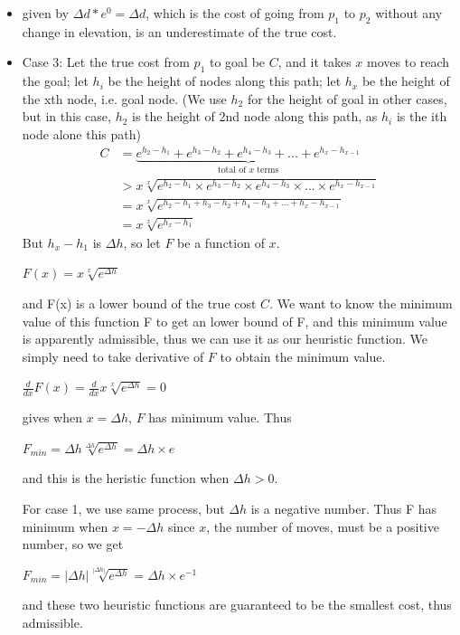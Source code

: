 \documentclass[11pt]{article}  %
\begin{document}
\begin{itemize}
\item  given by $\Delta d * e^{0} = \Delta d$, which is the cost of going from $p_1$ to $p_2$ without any change in elevation, is an underestimate of the true cost. 
\item Case 3: Let the true cost from $p_1$ to goal be $C$, and it takes $x$ moves to reach the goal; let $h_i$ be the height of nodes along this path; let $h_x$ be the height of the xth node, i.e. goal node. (We use $h_2$ for the height of goal in other cases, but in this case, $h_2$ is the height of 2nd node along this path, as $h_i$ is the ith node alone this path)
\begin{align}
C &= \underbrace{e^{h_2-h_1}+e^{h_3-h_2}+e^{h_4-h_3} + ... + e^{h_x-h_{x-1}}}_{\mbox{total of $x$ terms}}\\
&> x \sqrt[x]{e^{h_2-h_1} \times e^{h_3-h_2} \times e^{h_4-h_3} \times ... \times e^{h_x-h_{x-1}}}\\
&= x \sqrt[x]{e^{h_2-h_1+h_3-h_2+h_4-h_3 +... +h_x-h_{x-1}}}\\
&= x \sqrt[x]{e^{h_x-h_1}}
\end{align}
But $h_x - h_1$ is $\Delta h$, so let $F$ be a function of $x$.
\begin{center}
$F(x) = x \sqrt[x]{e^{\Delta h}}$
\end{center}
and F(x) is a lower bound of the true cost $C$. We want to know the minimum value of this function F to get an lower bound of F, and this minimum value is apparently admissible, thus we can use it as our heuristic function. We simply need to take derivative of $F$ to obtain the minimum value.
\begin{center} 
$\frac{d}{dx} F(x) = \frac{d}{dx} x \sqrt[x]{e^{\Delta h}} = 0 $
\end{center}
gives when $x=\Delta h$, $F$ has minimum value. Thus
\begin{center} 
$F_{min} = \Delta h  \sqrt[\Delta h]{e^{\Delta h}} = \Delta h \times e$
\end{center}
and this is the heristic function when $\Delta h > 0$. 

For case 1, we use same process, but $\Delta h$ is a negative number. Thus F has minimum when $x=-\Delta h$ since $x$, the number of moves, must be a positive number, so we get
\begin{center} 
$F_{min} = |\Delta h|  \sqrt[|\Delta h|]{e^{\Delta h}} = \Delta h \times e^{-1}$
\end{center} 
and these two heuristic functions are guaranteed to be the smallest cost, thus admissible.




\end{itemize}
\end{document}
